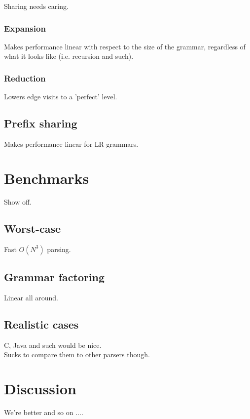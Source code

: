 \documentclass[a4paper,10pt]{article}
\begin{document}
Sharing needs caring.

\subsubsection{Expansion}

Makes performance linear with respect to the size of the grammar, regardless of what it looks like (i.e. recursion and such).

\subsubsection{Reduction}

Lowers edge visits to a 'perfect' level.

\subsection{Prefix sharing}

Makes performance linear for LR grammars.

\section{Benchmarks}

Show off.

\subsection{Worst-case}

Fast $O(N^3)$ parsing.

\subsection{Grammar factoring}

Linear all around.

\subsection{Realistic cases}

C, Java and such would be nice.\\
Sucks to compare them to other parsers though.

\section{Discussion}

We're better and so on ....
\end{document}
